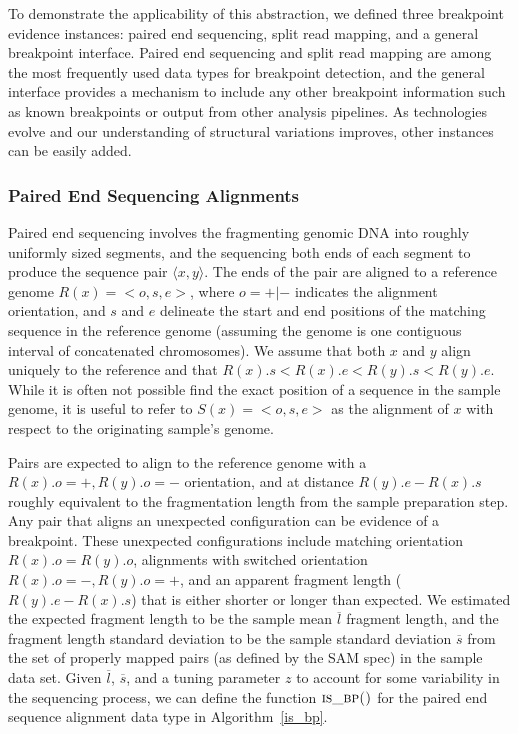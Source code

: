 \documentclass[11pt]{article}
\begin{document}
To demonstrate the applicability of this abstraction, we defined three
breakpoint evidence instances: paired end sequencing, split read mapping, and a
general breakpoint interface.  Paired end sequencing and split read mapping are
among the most frequently used data types for breakpoint detection, and the
general interface provides a mechanism to include any other breakpoint
information such as known breakpoints or output from other analysis pipelines.
As technologies evolve and our understanding of structural variations improves,
other instances can be easily added.

\subsubsection{Paired End Sequencing Alignments}

Paired end sequencing involves the fragmenting genomic DNA into roughly
uniformly sized segments, and the sequencing both ends of each segment to
produce the sequence pair $\langle x,y \rangle$.  The ends of the pair are
aligned to a reference genome $R(x)=<o,s,e>$, where $o=+|-$ indicates the
alignment orientation, and $s$ and $e$ delineate the start and end positions of
the matching sequence in the reference genome (assuming the genome is one
contiguous interval of concatenated chromosomes).  We assume that both $x$ and
$y$ align uniquely to the reference and that $R(x).s<R(x).e<R(y).s<R(y).e$.
While it is often not possible find the exact position of a sequence in the
sample genome, it is useful to refer to  $S(x)=<o,s,e>$ as the alignment of $x$
with respect to the originating sample's genome.

Pairs are expected to align to the reference genome with a $R(x).o=+, R(y).o=-$
orientation, and at distance $R(y).e - R(x).s$ roughly equivalent to the
fragmentation length from the sample preparation step.  Any pair that aligns an
unexpected configuration can be evidence of a breakpoint.  These unexpected
configurations include matching orientation $R(x).o = R(y).o$, alignments with
switched orientation $R(x).o=-, R(y).o=+$, and an apparent fragment length
($R(y).e - R(x).s$) that is either shorter or longer than expected.  We
estimated the expected fragment length to be the sample mean $\overline{l}$
fragment length, and the fragment length standard deviation to be the sample
standard deviation $\overline{s}$ from the set of properly mapped pairs (as
defined by the SAM spec) in the sample data set.  Given $\overline{l}$,
$\overline{s}$, and a tuning parameter $z$ to account for some variability in
the sequencing process, we can define the function $\textsc{is\_bp()}$ for the
paired end sequence alignment data type in Algorithm~\ref{is_bp}.
\end{document}
